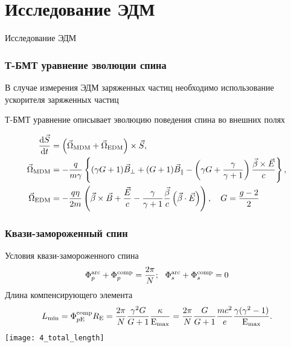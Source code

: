 \section{Исследование ЭДМ}
\begin{frame}
	\centering \Large{Исследование ЭДМ}
\end{frame}
\begin{frame}
	\frametitle{Т-БМТ уравнение эволюции спина}
	\par В случае измерения ЭДМ заряженных частиц необходимо использование ускорителя заряженных частиц
	\par Т-БМТ уравнение описывает эволюцию поведения спина во внешних полях
	
	\begin{equation}	
		\begin{aligned} 
			\dv{{\vec{S}}}{t} &=\left(\vec{\Omega}_{\textrm{MDM}}+\vec{\Omega}_{\textrm{EDM}}\right) \times \vec{S}, \\
			\vec{\Omega}_{\textrm{MDM}}&=-\frac{q}{m \gamma}\left\{(\gamma G+1)\vec{B}_{\perp}+(G+1)\vec{B}_{\parallel}-\left(\gamma G+\frac{\gamma}{\gamma+1}\right) \frac{\vec{\beta} \times \vec{E}}{c}\right\}, \\
			\vec{\Omega}_{\textrm{EDM}}&=-\frac{q \eta}{2 m}\left(\vec{\beta} \times \vec{B}+\frac{\vec{E}}{c}-\frac{\gamma}{\gamma+1}\frac{\vec{\beta}}{c}\left(\vec{\beta}\cdot\vec{E}\right)\right), \quad G=\frac{g-2}{2}
		\end{aligned}
		\label{eq:T-BMT}
	\end{equation}
\end{frame}
\begin{frame}
	\frametitle{Квази-замороженный спин}
	Условия квази-замороженного спина
	\begin{equation}
		\tiny
		\Phi_p^{\textrm{arc}}+\Phi_{p}^{\textrm{comp}}=\frac{2\pi}{N};\quad \Phi_s^{\textrm{arc}}+\Phi_{s}^{\textrm{comp}}=0
		\label{eq:QFS_orbital}
	\end{equation}
	\normalsize
	Длина компенсирующего элемента
	\begin{equation}
		\tiny
		L_{\text{min}} = \Phi_{p\mathrm{E}}^{\text{comp}}R_{\mathrm{E}}=
		\frac{2\pi}{N}\frac{\gamma^2 G}{G+1}\frac{\kappa}{\mathrm{E}_{\text{max}}}
		= \frac{2\pi}{N}\frac{G}{G+1}\frac{mc^2}{e}\frac{\gamma(\gamma^2-1)}{\mathrm{E}_{\text{max}}}.
		\label{eq:length_min}
	\end{equation}
	\normalsize
	\centering
	\texttt{[image: 4\_total\_length]}
\end{frame}

